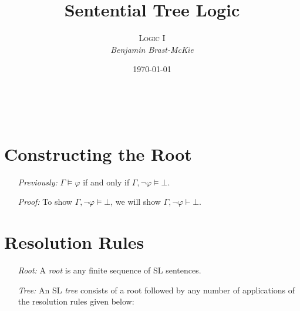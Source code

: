 \documentclass[a4paper, 11pt]{article} %
\title{\textbf{Sentential Tree Logic}} %
\author{\textsc{Logic I}\\ \em Benjamin Brast-McKie} %
\date{\today} %
\makeatletter
\newcommand{\set}[1]{\lbrace#1\rbrace} %
\renewcommand{\maketitle}{ %
\begin{flushright} %
{\LARGE\@title} %

\vspace{10pt} %

{\@author} %
\\\@date %

\vspace{-10pt} %
\end{flushright}
}
\makeatother
\begin{document}
\maketitle %

\thispagestyle{empty}


\section*{Constructing the Root}

\begin{enumerate}[leftmargin=1.5in,labelsep=.15in] %
  \item[\it Previously:] $\Gamma \vDash \varphi$ if and only if $\Gamma, \neg \varphi \vDash \bot$.
  \item[\it Proof:] To show $\Gamma, \neg \varphi \vDash \bot$, we will show $\Gamma, \neg \varphi \vdash \bot$.
\end{enumerate}





\section*{Resolution Rules}

\begin{enumerate}
  \item[\it Root:] A \textit{root} is any finite sequence of SL sentences.
  \item[\it Tree:] An SL \textit{tree} consists of a root followed by any number of applications of the resolution rules given below:
\end{enumerate}
\end{document}
